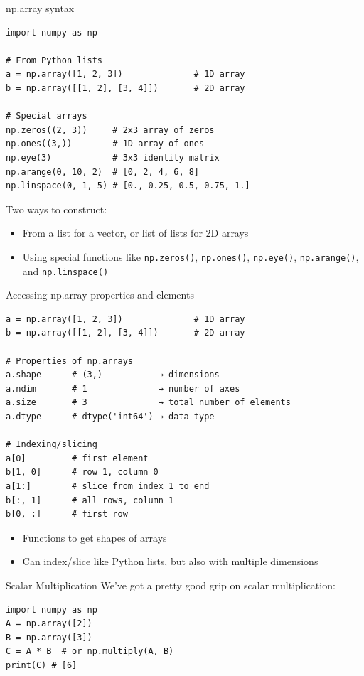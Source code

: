\documentclass{beamer}
\begin{document}
\begin{frame}[fragile]{np.array syntax}
\begin{verbatim}
import numpy as np

# From Python lists
a = np.array([1, 2, 3])              # 1D array
b = np.array([[1, 2], [3, 4]])       # 2D array

# Special arrays
np.zeros((2, 3))     # 2x3 array of zeros
np.ones((3,))        # 1D array of ones
np.eye(3)            # 3x3 identity matrix
np.arange(0, 10, 2)  # [0, 2, 4, 6, 8]
np.linspace(0, 1, 5) # [0., 0.25, 0.5, 0.75, 1.]
\end{verbatim}
Two ways to construct:
\begin{itemize}
\item From a list for a vector, or list of lists for 2D arrays
\item Using special functions like \texttt{np.zeros()}, \texttt{np.ones()}, \texttt{np.eye()}, \texttt{np.arange()}, and \texttt{np.linspace()}
\end{itemize}
\end{frame}


\begin{frame}[fragile]{Accessing np.array properties and elements}
\begin{verbatim}
a = np.array([1, 2, 3])              # 1D array
b = np.array([[1, 2], [3, 4]])       # 2D array

# Properties of np.arrays
a.shape      # (3,)           → dimensions
a.ndim       # 1              → number of axes
a.size       # 3              → total number of elements
a.dtype      # dtype('int64') → data type

# Indexing/slicing
a[0]         # first element
b[1, 0]      # row 1, column 0
a[1:]        # slice from index 1 to end
b[:, 1]      # all rows, column 1
b[0, :]      # first row

\end{verbatim}
\begin{itemize}
\item Functions to get shapes of arrays
\item Can index/slice like Python lists, but also with multiple dimensions
\end{itemize}
\end{frame}

\begin{frame}[fragile]{Scalar Multiplication}
We've got a pretty good grip on scalar multiplication:

\begin{verbatim}
import numpy as np
A = np.array([2])
B = np.array([3])
C = A * B  # or np.multiply(A, B)
print(C) # [6]
\end{verbatim}

\end{frame}
\end{document}
